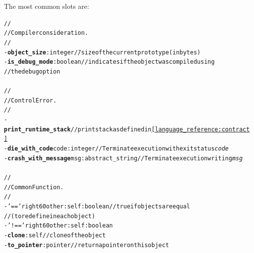 \documentclass[11pt]{mybook}
\begin{document}
The most common slots are:
\begin{alltt}
\begin{tabbing}
  //\\
  // Compiler consideration.\\
  //\\
  - {\bf{}object\_size}:{\sc{}integer}    \= // size of the current prototype (in bytes)\\
  - {\bf{}is\_debug\_mode}:{\sc{}boolean} \> // indicates if the object was compiled using\\
                                          \> // the debug option\\
\\
  //\\
  // Control Error.\\
  //\\
  - {\bf{}print\_runtime\_stack}               \> // print stack as defined in {\ref{language_reference:contract}}\\
  - {\bf{}die\_with\_code} code:{\sc{}integer} \>     // Terminate execution with exit status {\it{}code}\\
  - {\bf{}crash\_with\_message} msg:{\sc{}abstract\_string} \>                 // Terminate execution writing {\it{}msg}\\
\\
  //\\
  // Common Function.\\
  // \\
  - '=='  right 60 other:{\sc{}self} :{\sc{}boolean} \>             // {\sc{}true} if objects are equal \\
                                                     \>             // (to redefine in each object) \\
  - '!==' right 60 other:{\sc{}self} :{\sc{}boolean}\\  
  - {\bf{}clone}:{\sc{}self}                         \> // clone of the object\\
  - {\bf{}to\_pointer}:{\sc{}pointer}                \> // return a pointer on this object\\
\end{tabbing}
\end{alltt}

\end{document}

